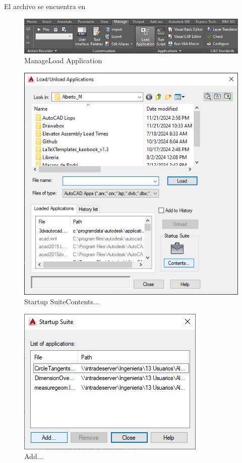 \documentclass{report}
\begin{document}
El archivo se encuentra en 

\begin{figure}[H]
	\centering
	\includegraphics[width=0.95\linewidth, height=0.5\textheight,keepaspectratio]{Imagenes/autocad_measuregeom01}
	\caption{Manage\textrightarrow Load Application}
	\label{fig:autocadmeasuregeom01}
\end{figure}

\begin{figure}[H]
	\centering
	\includegraphics[width=0.85\linewidth, height=0.5\textheight,keepaspectratio]{Imagenes/autocad_measuregeom02}
	\caption{Startup Suite\textrightarrow Contents...}
	\label{fig:autocadmeasuregeom02}
\end{figure}

\begin{figure}[H]
	\centering
	\includegraphics[width=0.65\linewidth, height=0.5\textheight,keepaspectratio]{Imagenes/autocad_measuregeom03}
	\caption{Add...}
	\label{fig:autocadmeasuregeom03}
\end{figure}
\end{document}
